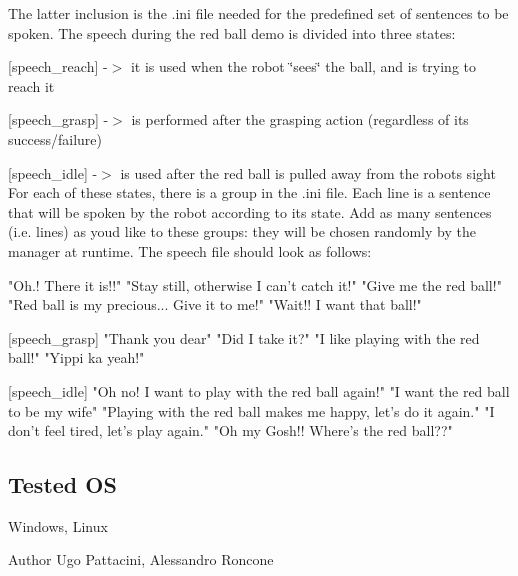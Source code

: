 The latter inclusion is the .ini file needed for the predefined set of sentences to be spoken. The speech during the red ball demo is divided into three states\+:
\begin{DoxyItemize}
\item \mbox{[}speech\+\_\+reach\mbox{]} -\/$>$ it is used when the robot \char`\"{}sees\char`\"{} the ball, and is trying to reach it
\item \mbox{[}speech\+\_\+grasp\mbox{]} -\/$>$ is performed after the grasping action (regardless of its success/failure)
\item \mbox{[}speech\+\_\+idle\mbox{]} -\/$>$ is used after the red ball is pulled away from the robot\textquotesingle{}s sight For each of these states, there is a group in the .ini file. Each line is a sentence that will be spoken by the robot according to its state. Add as many sentences (i.\+e. lines) as you\textquotesingle{}d like to these groups\+: they will be chosen randomly by the manager at runtime. The speech file should look as follows\+: 
\begin{DoxyCode}
\textcolor{stringliteral}{"Oh.! There it is!!"}
\textcolor{stringliteral}{"Stay still, otherwise I can't catch it!"}
\textcolor{stringliteral}{"Give me the red ball!"}
\textcolor{stringliteral}{"Red ball is my precious... Give it to me!"}
\textcolor{stringliteral}{"Wait!! I want that ball!"}

[speech\_grasp]
\textcolor{stringliteral}{"Thank you dear"}
\textcolor{stringliteral}{"Did I take it?"}
\textcolor{stringliteral}{"I like playing with the red ball!"}
\textcolor{stringliteral}{"Yippi ka yeah!"}

[speech\_idle]
\textcolor{stringliteral}{"Oh no! I want to play with the red ball again!"}
\textcolor{stringliteral}{"I want the red ball to be my wife"}
\textcolor{stringliteral}{"Playing with the red ball makes me happy, let's do it again."}
\textcolor{stringliteral}{"I don't feel tired, let's play again."}
\textcolor{stringliteral}{"Oh my Gosh!! Where's the red ball??"}
\end{DoxyCode}

\end{DoxyItemize}\hypertarget{group__src__demoYoga_tested_os_sec}{}\subsection{Tested OS}\label{group__src__demoYoga_tested_os_sec}
Windows, Linux

\begin{DoxyAuthor}{Author}
Ugo Pattacini, Alessandro Roncone 
\end{DoxyAuthor}
